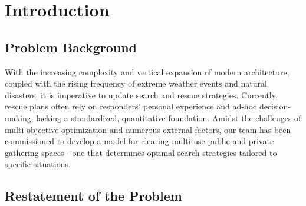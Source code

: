 \section{Introduction}
\vspace{-0.4cm}%
\subsection{Problem Background}



\vspace{-0.2cm}%

With the increasing complexity and vertical expansion of modern architecture, coupled with the rising frequency of extreme weather events and natural disasters, it is imperative to update search and rescue strategies. Currently, rescue plans often rely on responders’ personal experience and ad-hoc decision-making, lacking a standardized, quantitative foundation. Amidst the challenges of multi-objective optimization and numerous external factors,
our team has been commissioned to develop a model for clearing multi-use public and private gathering spaces - one that determines optimal search strategies tailored to specific situations.
\vspace{-0.4cm}%
\subsection{Restatement of the Problem}
\vspace{-0.1cm}%

